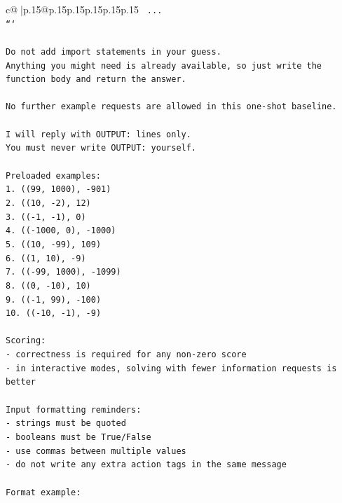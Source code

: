 \documentclass{article}
\begin{document}
{\begin{supertabular}{c@{$\;$}|p{.15\linewidth}@{}p{.15\linewidth}p{.15\linewidth}p{.15\linewidth}p{.15\linewidth}p{.15\linewidth}}
{{{\texttt{    ...} \\
\texttt{```} \\
\\ 
\texttt{Do not add import statements in your guess.} \\
\texttt{Anything you might need is already available, so just write the function body and return the answer.} \\
\\ 
\texttt{No further example requests are allowed in this one{-}shot baseline.} \\
\\ 
\texttt{I will reply with OUTPUT: lines only.} \\
\texttt{You must never write OUTPUT: yourself.} \\
\\ 
\texttt{Preloaded examples:} \\
\texttt{1. ((99, 1000), {-}901)} \\
\texttt{2. ((10, {-}2), 12)} \\
\texttt{3. (({-}1, {-}1), 0)} \\
\texttt{4. (({-}1000, 0), {-}1000)} \\
\texttt{5. ((10, {-}99), 109)} \\
\texttt{6. ((1, 10), {-}9)} \\
\texttt{7. (({-}99, 1000), {-}1099)} \\
\texttt{8. ((0, {-}10), 10)} \\
\texttt{9. (({-}1, 99), {-}100)} \\
\texttt{10. (({-}10, {-}1), {-}9)} \\
\\ 
\texttt{Scoring:} \\
\texttt{{-} correctness is required for any non{-}zero score} \\
\texttt{{-} in interactive modes, solving with fewer information requests is better} \\
\\ 
\texttt{Input formatting reminders:} \\
\texttt{{-} strings must be quoted} \\
\texttt{{-} booleans must be True/False} \\
\texttt{{-} use commas between multiple values} \\
\texttt{{-} do not write any extra action tags in the same message} \\
\\ 
\texttt{Format example:} \\
}}}
\end{supertabular}}
\end{document}
